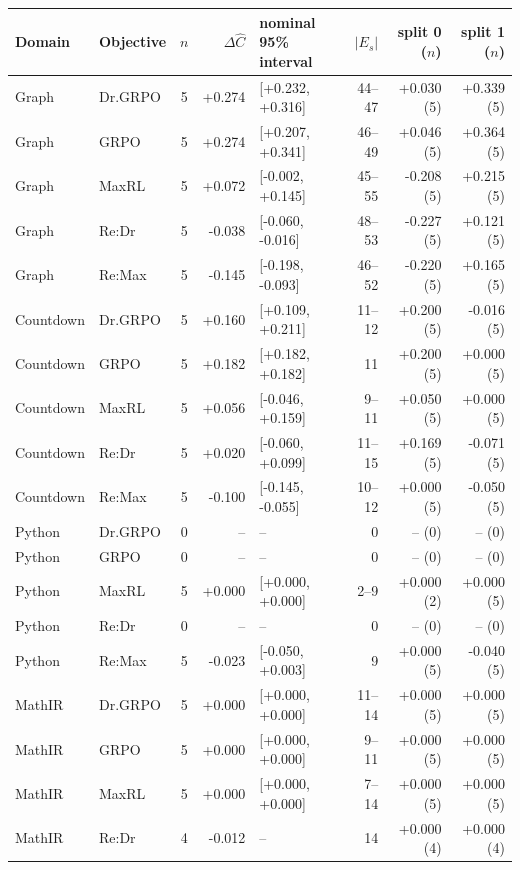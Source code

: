 \begin{table}[!htbp]
\centering
\scriptsize
\setlength{\tabcolsep}{3pt}
\begin{tabular}{@{}llcrlrrr@{}}
\toprule
Domain & Objective & $n$ & $\Delta\widehat C$ & nominal 95\% interval & $|E_s|$ & split 0 ($n$) & split 1 ($n$) \\
\midrule
Graph & Dr.GRPO & 5 & +0.274 & [+0.232, +0.316] & 44--47 & +0.030 (5) & +0.339 (5) \\
Graph & GRPO & 5 & +0.274 & [+0.207, +0.341] & 46--49 & +0.046 (5) & +0.364 (5) \\
Graph & MaxRL & 5 & +0.072 & [-0.002, +0.145] & 45--55 & -0.208 (5) & +0.215 (5) \\
Graph & Re:Dr & 5 & -0.038 & [-0.060, -0.016] & 48--53 & -0.227 (5) & +0.121 (5) \\
Graph & Re:Max & 5 & -0.145 & [-0.198, -0.093] & 46--52 & -0.220 (5) & +0.165 (5) \\
Countdown & Dr.GRPO & 5 & +0.160 & [+0.109, +0.211] & 11--12 & +0.200 (5) & -0.016 (5) \\
Countdown & GRPO & 5 & +0.182 & [+0.182, +0.182] & 11 & +0.200 (5) & +0.000 (5) \\
Countdown & MaxRL & 5 & +0.056 & [-0.046, +0.159] & 9--11 & +0.050 (5) & +0.000 (5) \\
Countdown & Re:Dr & 5 & +0.020 & [-0.060, +0.099] & 11--15 & +0.169 (5) & -0.071 (5) \\
Countdown & Re:Max & 5 & -0.100 & [-0.145, -0.055] & 10--12 & +0.000 (5) & -0.050 (5) \\
Python & Dr.GRPO & 0 & -- & -- & 0 & -- (0) & -- (0) \\
Python & GRPO & 0 & -- & -- & 0 & -- (0) & -- (0) \\
Python & MaxRL & 5 & +0.000 & [+0.000, +0.000] & 2--9 & +0.000 (2) & +0.000 (5) \\
Python & Re:Dr & 0 & -- & -- & 0 & -- (0) & -- (0) \\
Python & Re:Max & 5 & -0.023 & [-0.050, +0.003] & 9 & +0.000 (5) & -0.040 (5) \\
MathIR & Dr.GRPO & 5 & +0.000 & [+0.000, +0.000] & 11--14 & +0.000 (5) & +0.000 (5) \\
MathIR & GRPO & 5 & +0.000 & [+0.000, +0.000] & 9--11 & +0.000 (5) & +0.000 (5) \\
MathIR & MaxRL & 5 & +0.000 & [+0.000, +0.000] & 7--14 & +0.000 (5) & +0.000 (5) \\
MathIR & Re:Dr & 4 & -0.012 & -- & 14 & +0.000 (4) & +0.000 (4) \\

\end{tabular}
\end{table}
